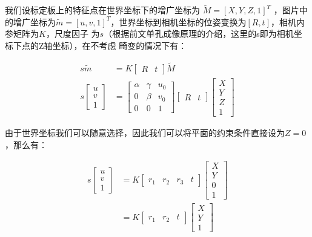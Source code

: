 我们设标定板上的特征点在世界坐标下的增广坐标为 $\tilde{M} = [X, Y, Z, 1]^T$ ，图片中的增广坐标为$\tilde{m} = [u, v, 1]^T$，世界坐标到相机坐标的位姿变换为$[R, t]$，相机内参矩阵为$K$，尺度因子
为$s$（根据前文单孔成像原理的介绍，这里的s即为相机坐标下点的Z轴坐标），在不考虑
畸变的情况下有：

\begin{equation}
  \begin{aligned}
  	s \tilde{m} &= K 
		\begin{bmatrix}
			R & t
		\end{bmatrix}
		\tilde{M} \\
	s
  	\begin{bmatrix}
  		u \\
  		v \\
  		1
  	\end{bmatrix} &= 
  	\begin{bmatrix}
  		\alpha & \gamma & u_0 \\
  		0      & \beta  & v_0 \\
  		0      & 0      & 1
  	\end{bmatrix}
  	\begin{bmatrix}
		R & t
	\end{bmatrix}
	\begin{bmatrix}
		X \\
		Y \\
		Z \\
		1
	\end{bmatrix}
  \end{aligned}
\end{equation}

由于世界坐标我们可以随意选择，因此我们可以将平面的约束条件直接设为$Z = 0$，那么有：

\begin{equation}
  \label{equ:cam}
  \begin{aligned}
	s
  	\begin{bmatrix}
  		u \\
  		v \\
  		1
  	\end{bmatrix}
  	&= K
  	\begin{bmatrix}
		r_1 & r_2 & r_3 & t
	\end{bmatrix}
	\begin{bmatrix}
		X \\
		Y \\
		0 \\
		1
	\end{bmatrix} \\
	&= K
	\begin{bmatrix}
		r_1 & r_2 & t
	\end{bmatrix}
	\begin{bmatrix}
		X \\
		Y \\
		1
	\end{bmatrix}
  \end{aligned}
\end{equation}

